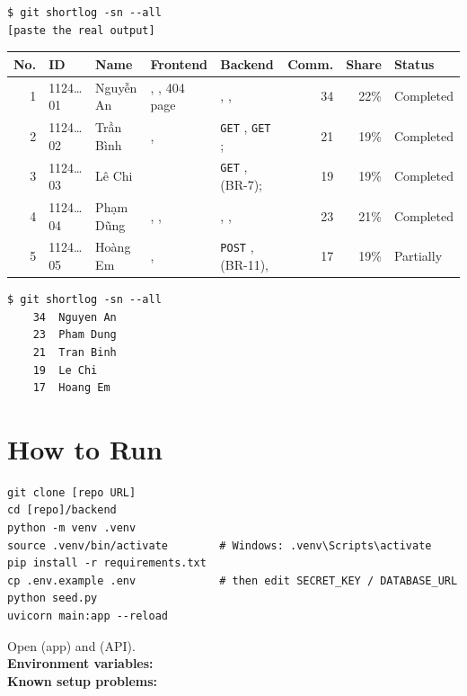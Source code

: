 \documentclass[11pt,a4paper]{article}
\newcommand{\fillin}[1]{\leavevmode{\color{fill}[#1]}}
\newcommand{\code}[1]{\texttt{#1}}
\newenvironment{example}{\begin{examplebox}}{\end{examplebox}}
\begin{document}
\begin{lstlisting}
$ git shortlog -sn --all
[paste the real output]
\end{lstlisting}

\begin{example}
\footnotesize
\begin{tabularx}{\linewidth}{@{}r l >{\raggedright\arraybackslash}p{1.7cm} Y Y r r l@{}}
\toprule
No. & ID & Name & Frontend & Backend & Comm. & Share & Status \\
 & 1124\ldots01 & Nguyễn An   & , , 404 page & , ,  & 34 & 22\% & Completed \\
2 & 1124\ldots02 & Trần Bình   & ,  & \code{GET} , \code{GET} ;  & 21 & 19\% & Completed \\
3 & 1124\ldots03 & Lê Chi      &  & \code{GET} ,  (BR-7);  & 19 & 19\% & Completed \\
4 & 1124\ldots04 & Phạm Dũng   & , ,  & , ,  & 23 & 21\% & Completed \\
5 & 1124\ldots05 & Hoàng Em    & ,  & \code{POST} ,  (BR-11),  & 17 & 19\% & Partially \\
\bottomrule
\end{tabularx}
\begin{lstlisting}
$ git shortlog -sn --all
    34  Nguyen An
    23  Pham Dung
    21  Tran Binh
    19  Le Chi
    17  Hoang Em
\end{lstlisting}
\end{example}

\section{How to Run}
\begin{lstlisting}
git clone [repo URL]
cd [repo]/backend
python -m venv .venv
source .venv/bin/activate        # Windows: .venv\Scripts\activate
pip install -r requirements.txt
cp .env.example .env             # then edit SECRET_KEY / DATABASE_URL
python seed.py
uvicorn main:app --reload
\end{lstlisting}
Open  (app) and  (API).\\
\textbf{Environment variables:} \fillin{name --- meaning --- example}\\
\textbf{Known setup problems:} \fillin{ }
\end{document}
